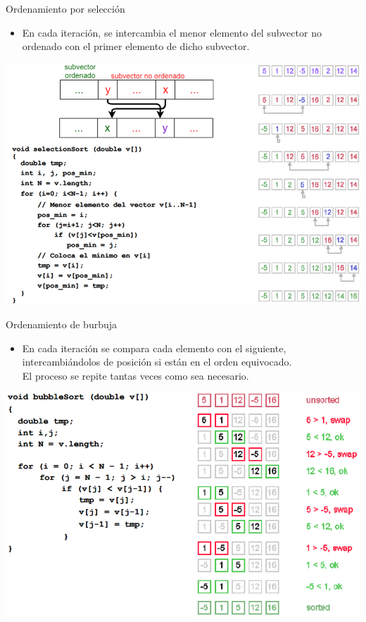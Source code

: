 \documentclass{beamer} %
\begin{document}
\begin{frame}{Ordenamiento por selección}
    \begin{itemize}
        \item {\footnotesize En cada iteración, se intercambia el menor elemento del subvector no ordenado con el primer elemento de dicho subvector.}
    \end{itemize}
    \begin{center}
        \includegraphics[width=.8\textwidth]{./image/cap5/selection-sort.png}
    \end{center}
\end{frame}

\begin{frame}{Ordenamiento de burbuja}
    \begin{itemize}
        \item {\footnotesize En cada iteración se compara cada elemento con el siguiente, intercambiándolos de posición si están en el orden equivocado.\\
        El proceso se repite tantas veces como sea necesario.}
    \end{itemize}
    \begin{center}
        \includegraphics[width=.8\textwidth]{./image/cap5/bubble-sort.png}
    \end{center}
\end{frame}
\end{document}
